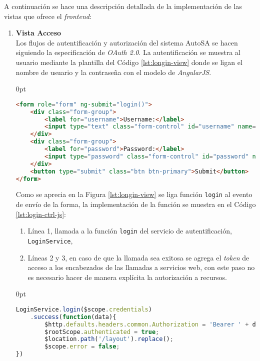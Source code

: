 A continuación se hace una descripción detallada de la implementación de las vistas que ofrece el \textit{frontend}:
\begin{enumerate}
\item \textbf{Vista Acceso}\\
Los flujos de autentificación y autorización del sistema AutoSA se hacen siguiendo la especificación de \textit{OAuth 2.0}. La autentificación se muestra al usuario mediante la plantilla del Código \ref{lst:longin-view} donde se ligan el nombre de usuario y la contraseña con el modelo de \textit{AngularJS}.

\begin{adjustwidth}{\listingfixwidth}{0pt}
\begin{lstlisting}[language=HTML, caption={Plantilla HTML de acceso.}, captionpos=b, label={lst:longin-view}]
<form role="form" ng-submit="login()">
	<div class="form-group">
		<label for="username">Username:</label>
		<input type="text" class="form-control" id="username" name="username" ng-model="credentials.username"/>
	</div>
	<div class="form-group">
		<label for="password">Password:</label>
		<input type="password" class="form-control" id="password" name="password" ng-model="credentials.password"/>
	</div>
	<button type="submit" class="btn btn-primary">Submit</button>
</form>
\end{lstlisting}
\end{adjustwidth}


Como se aprecia en la Figura \ref{lst:longin-view} se liga función \texttt{login} al evento de envío de la forma, la implementación de la función se muestra en el Código \ref{lst:login-ctrl-js}:
\begin{enumerate}
	\item Línea 1, llamada a la función \texttt{login} del servicio de autentificación, \texttt{LoginService},
	\item Líneas 2 y 3, en caso de que la llamada sea exitosa se agrega el \textit{token} de acceso a los encabezados de las llamadas a servicios web, con este paso no es necesario hacer de manera explícita la autorización a recursos.
\end{enumerate}

\pagebreak
\begin{adjustwidth}{\listingfixwidth}{0pt}
\begin{lstlisting}[language=Javascript, caption={Petición de un \textit{token} de acceso.}, captionpos=b, label={lst:login-ctrl-js}]
LoginService.login($scope.credentials)
	.success(function(data){
		$http.defaults.headers.common.Authorization = 'Bearer ' + data.access_token;
		$rootScope.authenticated = true;
		$location.path('/layout').replace();
		$scope.error = false;
})
\end{lstlisting}
\end{adjustwidth}


\end{enumerate}
